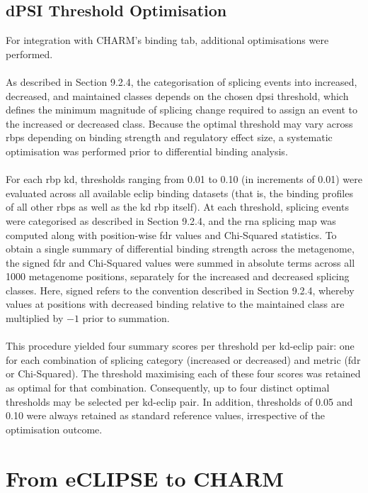 \subsection{dPSI Threshold Optimisation}

For integration with CHARM's binding tab, additional optimisations were performed.
\\
\\
As described in Section 9.2.4, the categorisation of splicing events into increased, decreased, and maintained classes depends on the chosen \gls{dpsi} threshold, which defines the minimum magnitude of splicing change required to assign an event to the increased or decreased class. Because the optimal threshold may vary across \glspl{rbp} depending on binding strength and regulatory effect size, a systematic optimisation was performed prior to differential binding analysis.
\\
\\
For each \gls{rbp} \gls{kd}, thresholds ranging from 0.01 to 0.10 (in increments of 0.01) were evaluated across all available \gls{eclip} binding datasets (that is, the binding profiles of all other \glspl{rbp} as well as the \gls{kd} \gls{rbp} itself). At each threshold, splicing events were categorised as described in Section 9.2.4, and the \gls{rna} splicing map was computed along with position-wise \gls{fdr} values and Chi-Squared statistics. To obtain a single summary of differential binding strength across the metagenome, the signed \gls{fdr} and Chi-Squared values were summed in absolute terms across all 1000 metagenome positions, separately for the increased and decreased splicing classes. Here, signed refers to the convention described in Section 9.2.4, whereby values at positions with decreased binding relative to the maintained class are multiplied by $-1 $ prior to summation.
\\
\\
This procedure yielded four summary scores per threshold per \gls{kd}-\gls{eclip} pair: one for each combination of splicing category (increased or decreased) and metric (\gls{fdr} or Chi-Squared). The threshold maximising each of these four scores was retained as optimal for that combination. Consequently, up to four distinct optimal thresholds may be selected per \gls{kd}-\gls{eclip} pair. In addition, thresholds of 0.05 and 0.10 were always retained as standard reference values, irrespective of the optimisation outcome.

\section{From eCLIPSE to CHARM}

